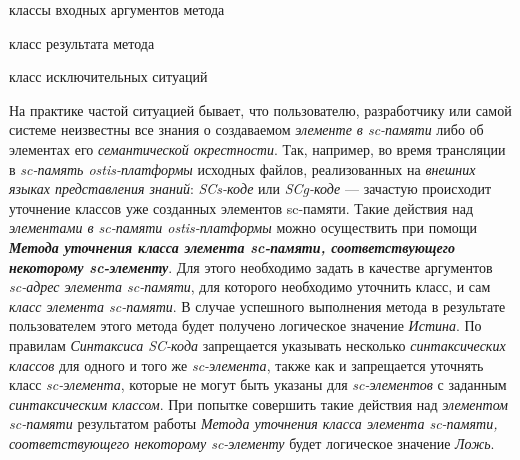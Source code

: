 \begin{SCn}
\begin{scnindent}
\end{scnindent}
\begin{scnrelfromvector}{классы входных аргументов метода}
\end{scnrelfromvector}
\begin{scnrelfromlist}{класс результата метода}
\end{scnrelfromlist}
\begin{scnrelfromlist}{класс исключительных ситуаций}
\end{scnrelfromlist}
\end{SCn}

На практике частой ситуацией бывает, что пользователю, разработчику или самой системе неизвестны все знания о создаваемом \textit{элементе в sc-памяти} либо об элементах его \textit{семантической окрестности}. Так, например, во время трансляции в \textit{sc-память ostis-платформы} исходных файлов, реализованных на \textit{внешних языках представления знаний}: \textit{SCs-коде} или \textit{SCg-коде} --- зачастую происходит уточнение классов уже созданных элементов sc-памяти. Такие действия над \textit{элементами в sc-памяти ostis-платформы} можно осуществить при помощи \textbf{\textit{Метода уточнения класса элемента sc-памяти, соответствующего некоторому sc-элементу}}. Для этого необходимо задать в качестве аргументов \textit{sc-адрес элемента sc-памяти}, для которого необходимо уточнить класс, и сам \textit{класс элемента sc-памяти\scnsupergroupsign}. В случае успешного выполнения метода в результате пользователем этого метода будет получено логическое значение \textit{Истина}. По правилам \textit{Синтаксиса SC-кода} запрещается указывать несколько \textit{синтаксических классов} для одного и того же \textit{sc-элемента}, также как и запрещается уточнять класс \textit{sc-элемента}, которые не могут быть указаны для \textit{sc-элементов} с заданным \textit{синтаксическим классом}. При попытке совершить такие действия над \textit{элементом sc-памяти} результатом работы \textit{Метода уточнения класса элемента sc-памяти, соответствующего некоторому sc-элементу} будет логическое значение \textit{Ложь}. 

